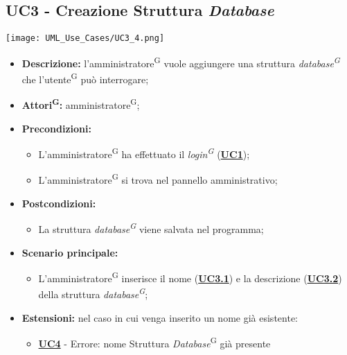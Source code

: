 \subsection{UC3 - Creazione Struttura \textit{Database}}
\label{sec:UC3}
\texttt{[image: UML\_Use\_Cases/UC3\_4.png]}
\begin{itemize}
	\item \textbf{Descrizione:} l’amministratore\textsuperscript{G} vuole aggiungere una struttura  \textit{database\textsuperscript{G}} che l'utente\textsuperscript{G} può interrogare;
	\item \textbf{Attori\textsuperscript{G}:} amministratore\textsuperscript{G};
	\item \textbf{Precondizioni:} 
	\begin{itemize}
		\item L’amministratore\textsuperscript{G} ha effettuato il \textit{login\textsuperscript{G}} (\hyperref[sec:UC1]{\textbf{UC1}});
		\item L’amministratore\textsuperscript{G} si trova nel pannello amministrativo;
	\end{itemize}
	\item \textbf{Postcondizioni:} 
	\begin{itemize}
		\item La struttura \textit{database\textsuperscript{G}} viene salvata nel programma;
	\end{itemize}
	\item \textbf{Scenario principale:} 
	\begin{itemize}
		\item L’amministratore\textsuperscript{G} inserisce il nome (\hyperref[sec:UC3.1]{\textbf{UC3.1}}) e la descrizione (\hyperref[sec:UC3.2]{\textbf{UC3.2}}) della struttura \textit{database\textsuperscript{G}};
	\end{itemize}
	\item \textbf{Estensioni:} nel caso in cui venga inserito un nome già esistente:
	\begin{itemize}
		\item \hyperref[sec:UC4]{\textbf{UC4}} - Errore: nome Struttura \textit{Database}\textsuperscript{G} già presente
	\end{itemize}
\end{itemize}

